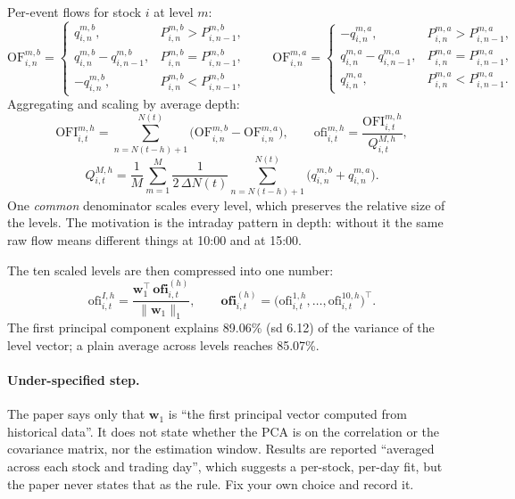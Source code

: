 \documentclass[11pt]{article}
\begin{document}
Per-event flows for stock $i$ at level $m$:
\begin{equation}
\mathrm{OF}^{m,b}_{i,n}=
\begin{cases}
q^{m,b}_{i,n}, & P^{m,b}_{i,n}>P^{m,b}_{i,n-1},\\
q^{m,b}_{i,n}-q^{m,b}_{i,n-1}, & P^{m,b}_{i,n}=P^{m,b}_{i,n-1},\\
-q^{m,b}_{i,n}, & P^{m,b}_{i,n}<P^{m,b}_{i,n-1},
\end{cases}
\qquad
\mathrm{OF}^{m,a}_{i,n}=
\begin{cases}
-q^{m,a}_{i,n}, & P^{m,a}_{i,n}>P^{m,a}_{i,n-1},\\
q^{m,a}_{i,n}-q^{m,a}_{i,n-1}, & P^{m,a}_{i,n}=P^{m,a}_{i,n-1},\\
q^{m,a}_{i,n}, & P^{m,a}_{i,n}<P^{m,a}_{i,n-1}.
\end{cases}
\end{equation}
Aggregating and scaling by average depth:
\begin{equation}
\mathrm{OFI}^{m,h}_{i,t}=\sum_{n=N(t-h)+1}^{N(t)}\bigl(\mathrm{OF}^{m,b}_{i,n}-\mathrm{OF}^{m,a}_{i,n}\bigr),
\qquad
\mathrm{ofi}^{m,h}_{i,t}=\frac{\mathrm{OFI}^{m,h}_{i,t}}{Q^{M,h}_{i,t}},
\end{equation}
\begin{equation}
Q^{M,h}_{i,t}=\frac{1}{M}\sum_{m=1}^{M}\frac{1}{2\,\Delta N(t)}
\sum_{n=N(t-h)+1}^{N(t)}\bigl(q^{m,b}_{i,n}+q^{m,a}_{i,n}\bigr).
\end{equation}
One \emph{common} denominator scales every level, which preserves the relative
size of the levels. The motivation is the intraday pattern in depth: without it
the same raw flow means different things at 10:00 and at 15:00.

The ten scaled levels are then compressed into one number:
\begin{equation}
\mathrm{ofi}^{I,h}_{i,t}=\frac{\mathbf{w}_1^{\!\top}\,\mathbf{ofi}^{(h)}_{i,t}}{\lVert\mathbf{w}_1\rVert_1},
\qquad
\mathbf{ofi}^{(h)}_{i,t}=\bigl(\mathrm{ofi}^{1,h}_{i,t},\dots,\mathrm{ofi}^{10,h}_{i,t}\bigr)^{\!\top}.
\end{equation}
The first principal component explains 89.06\% (sd 6.12) of the variance of the
level vector; a plain average across levels reaches 85.07\%.

\paragraph{Under-specified step.} The paper says only that $\mathbf{w}_1$ is
``the first principal vector computed from historical data''. It does not state
whether the PCA is on the correlation or the covariance matrix, nor the
estimation window. Results are reported ``averaged across each stock and
trading day'', which suggests a per-stock, per-day fit, but the paper never
states that as the rule. Fix your own choice and record it.
\end{document}
